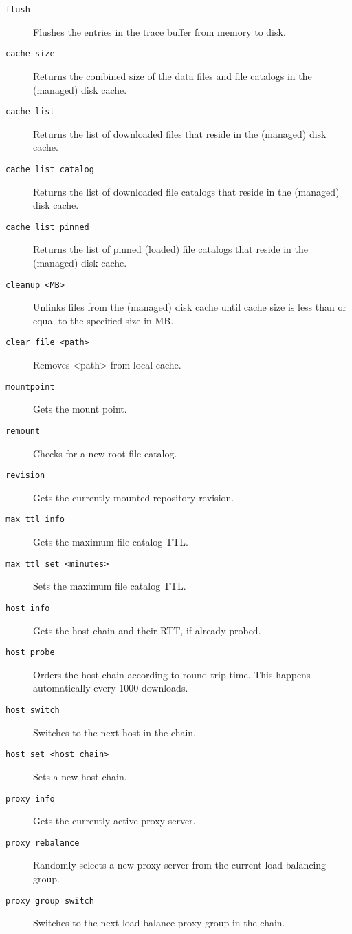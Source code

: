 \begin{description}
	\item[\tt flush] Flushes the entries in the trace buffer from memory to disk.
	\item[\tt cache size] Returns the combined size of the data files and file catalogs in the (managed) disk cache.
	\item[\tt cache list] Returns the list of downloaded files that reside in the (managed) disk cache.
	\item[\tt cache list catalog] Returns the list of downloaded file catalogs that reside in the (managed) disk cache.
	\item[\tt cache list pinned] Returns the list of pinned (loaded) file catalogs that reside in the (managed) disk cache.
	\item[\tt cleanup <MB>] Unlinks files from the (managed) disk cache until cache size is less than or equal to the specified size in MB.
	\item[\tt clear file <path>] Removes <path> from local cache.
	\item[\tt mountpoint] Gets the mount point.
	\item[\tt remount] Checks for a new root file catalog.
	\item[\tt revision] Gets the currently mounted repository revision.
	\item[\tt max ttl info] Gets the maximum file catalog TTL.
	\item[\tt max ttl set <minutes>] Sets the maximum file catalog TTL.
	\item[\tt host info] Gets the host chain and their RTT, if already probed.
	\item[\tt host probe] Orders the host chain according to round trip time.  This happens automatically every 1000 downloads.
	\item[\tt host switch] Switches to the next host in the chain.
	\item[\tt host set <host chain>] Sets a new host chain.
	\item[\tt proxy info] Gets the currently active proxy server.
	\item[\tt proxy rebalance] Randomly selects a new proxy server from the current load-balancing group.
	\item[\tt proxy group switch] Switches to the next load-balance proxy group in the chain.

\end{description}
